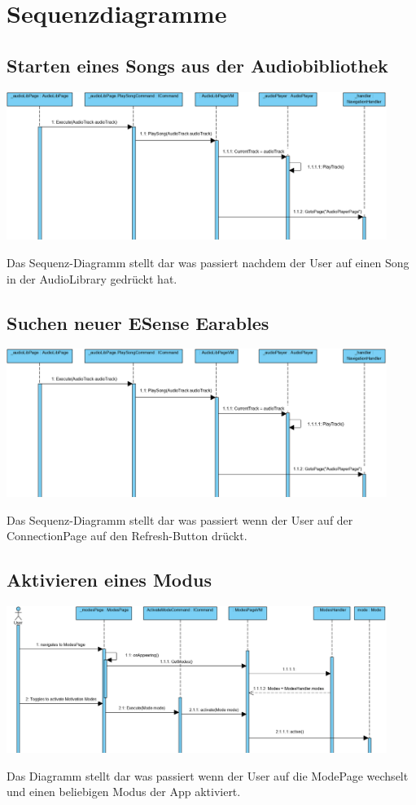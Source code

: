 \documentclass[../entwurf.tex]{subfiles}
\begin{document}
\section{Sequenzdiagramme}
\subsection{Starten eines Songs aus der Audiobibliothek}
\begin{center}
	\includegraphics[page=1,width=350pt,keepaspectratio]{../graphics/sequenz_diagramme/PlaySongSequenzDia.png}
\end{center}
Das Sequenz-Diagramm stellt dar was passiert nachdem der User auf einen Song in der AudioLibrary gedrückt hat.
\subsection{Suchen neuer ESense Earables}
\begin{center}
	\includegraphics[page=1,width=350pt,keepaspectratio]{../graphics/sequenz_diagramme/PlaySongSequenzDia.png}
\end{center}
Das Sequenz-Diagramm stellt dar was passiert wenn der User auf der ConnectionPage auf den Refresh-Button drückt.
\subsection{Aktivieren eines Modus}
\begin{center}
	\includegraphics[page=1,width=350pt,keepaspectratio]{../graphics/sequenz_diagramme/ActivateModeDia.png}
\end{center}
Das Diagramm stellt dar was passiert wenn der User auf die ModePage wechselt und einen beliebigen Modus der App aktiviert.
\end{document}
